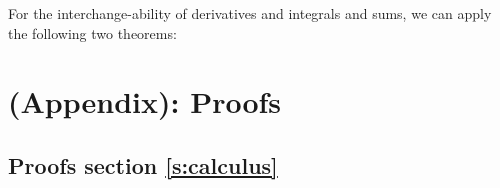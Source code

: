 For the interchange-ability of derivatives and integrals and sums, we can apply the following two theorems:
\begin{comment}
\begin{theorem}
    Leibnitz's Rule:
    Let \(f(x, \theta), a(\theta), b(\theta)\) be differentiable with respect to \(\theta\), then we have that:
    \[ \frac{d}{d\theta} \int_{a(\theta)}^{b(\theta)} f(x, \theta) dx = f(b(\theta), \theta) \frac{d b(\theta)}{d\theta} - f(a(\theta), \theta) \frac{d a(\theta)}{d\theta} + \int_{a(\theta)}^{b(\theta)} \frac{\partial f(x, \theta) }{\partial \theta} dx.\] For the special case, where \(a(\theta), b(\theta)\) are constant we have that: 
    \[\frac{d}{d\theta} \int_{a}^{b} f(x, \theta) dx =  \int_{a}^{b} \frac{ \partial f(x, \theta)}{ \partial d\theta}.\]
\end{theorem}

For the interchange-ability of derivatives and summations, the following theorem has been given by \cite{casella2002}:
\begin{theorem}
    Suppose that the series \(\sum_{x = 0}^{\infty} h(\theta, x)\) converges for all \(\theta\) in an interval \((a, b)\) of real numbers and 
    
    \begin{enumerate}[(i)]
        \item \(\frac{\partial h(\theta, x)}{\partial \theta}\) is continuous for all \(x\)
        \item \(\sum_{x = 0}^{\infty} \frac{\partial h(\theta, x)}{\partial \theta}\) converges uniformly on every closed bounded subinterval of \((a, b)\)
    \end{enumerate}
    Then:
    \[
    \frac{d}{d \theta} \left( \sum_{x = 0}^{\infty} h(\theta, x) \right) = \sum_{x = 0}^{\infty} \frac{\partial h(\theta, x)}{\partial \theta}
    \]
    
   
\end{theorem}
\end{comment}
\section{(Appendix): Proofs}\label{s:app_B}

\subsection{Proofs section \ref{s:calculus}}

